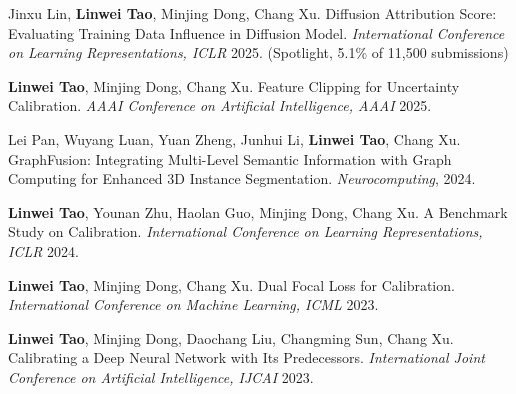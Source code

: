 \documentclass[a4paper, 10pt]{article}
\begin{document}
{\item Jinxu Lin, \textbf{Linwei Tao}, Minjing Dong, Chang Xu. Diffusion Attribution Score: Evaluating Training Data Influence in Diffusion Model. \textit{International Conference on Learning Representations, ICLR} 2025. \textcolor{highlightred}{(Spotlight, 5.1\% of 11,500 submissions)}

\item \textbf{Linwei Tao}, Minjing Dong, Chang Xu. Feature Clipping for Uncertainty Calibration. \textit{AAAI Conference on Artificial Intelligence, AAAI }2025.

\item Lei Pan, Wuyang Luan, Yuan Zheng, Junhui Li, \textbf{Linwei Tao}, Chang Xu. GraphFusion: Integrating Multi-Level Semantic Information with Graph Computing for Enhanced 3D Instance Segmentation. \textit{Neurocomputing}, 2024.

\item \textbf{Linwei Tao}, Younan Zhu, Haolan Guo, Minjing Dong, Chang Xu. A Benchmark Study on Calibration. \textit{International Conference on Learning Representations, ICLR} 2024.

\item \textbf{Linwei Tao}, Minjing Dong, Chang Xu. Dual Focal Loss for Calibration. \textit{International Conference on Machine Learning, ICML} 2023.

\item \textbf{Linwei Tao}, Minjing Dong, Daochang Liu, Changming Sun, Chang Xu. Calibrating a Deep Neural Network with Its Predecessors. \textit{International Joint Conference on Artificial Intelligence, IJCAI} 2023.
\pubListEnd
}
\end{document}

